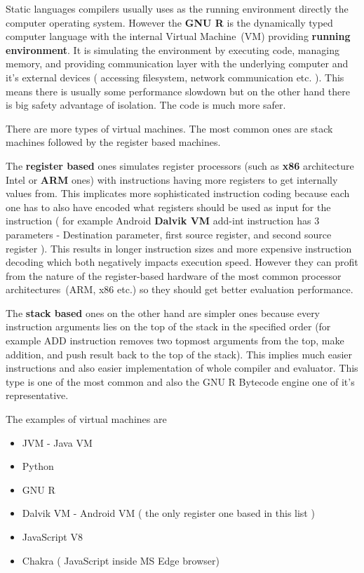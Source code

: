 \documentclass[thesis=M,english]{FITthesis}[2018/10/20]
\begin{document}
Static languages compilers usually uses as the running environment directly the computer operating system. However the \textbf{GNU R} is the dynamically typed computer language with the internal Virtual Machine~(VM) providing \textbf{running environment}. 
It is simulating the environment by executing code, managing memory, and providing communication layer with the underlying computer and it's external devices ( accessing filesystem, network communication etc. ). This means there is usually some performance slowdown but on the other hand there is big safety advantage of isolation. The code is much more safer.

There are more types of virtual machines. The most common ones are stack machines followed by the register based machines.

The \textbf{register based} ones simulates register processors (such as \textbf{x86} architecture Intel or \textbf{ARM} ones) with instructions having more registers to get internally values from. This implicates more sophisticated instruction coding because each one has to also have encoded what registers should be used as input for the instruction ( for example Android \textbf{Dalvik VM} add-int instruction has 3 parameters - Destination parameter, first source register, and second source register ). This results in longer instruction sizes and more expensive instruction decoding which both negatively impacts execution speed. However they can profit from the nature of the register-based hardware of the most common processor architectures~(ARM, x86 etc.) so they should get better evaluation performance.

The \textbf{stack based} ones on the other hand are simpler ones because every instruction arguments lies on the top of the stack in the specified order (for example ADD instruction removes two topmost arguments from the top, make addition, and push result back to the top of the stack). This implies much easier instructions and also easier implementation of whole compiler and evaluator. This type is one of the most common and also the GNU R Bytecode engine one of it's representative.

The examples of virtual machines are
\begin{itemize}
	\item JVM - Java VM
	\item Python
	\item GNU R
	\item Dalvik VM - Android VM ( the only register one based in this list )
	\item JavaScript V8
	\item Chakra ( JavaScript inside MS Edge browser)
\end{itemize}
\end{document}
